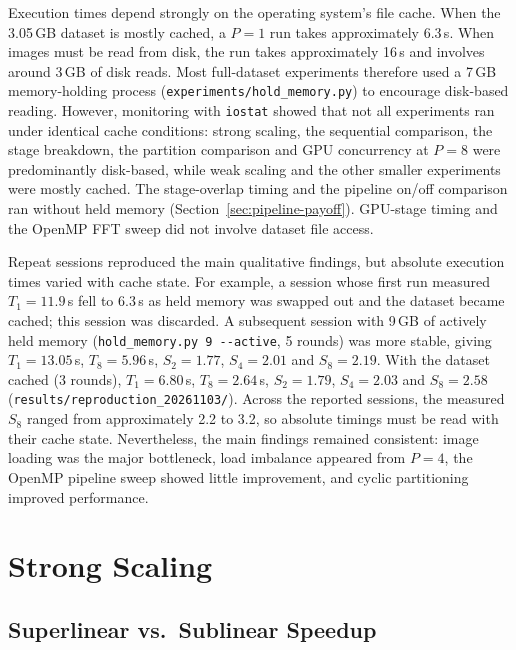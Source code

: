 \documentclass[a4paper,12pt]{report}
\begin{document}
Execution times depend strongly on the operating system's file cache. When the
3.05\,GB dataset is mostly cached, a $P=1$ run takes approximately 6.3\,s. When
images must be read from disk, the run takes approximately 16\,s and involves around
3\,GB of disk reads. Most full-dataset experiments therefore used a 7\,GB
memory-holding process (\texttt{experiments\slash{}hold\_\discretionary{}{}{}memory.py}) to
encourage disk-based reading. However, monitoring with \texttt{iostat} showed that
not all experiments ran under identical cache conditions: strong scaling, the
sequential comparison, the stage breakdown, the partition comparison and GPU
concurrency at $P=8$ were predominantly disk-based, while weak scaling and the other
smaller experiments were mostly cached. The stage-overlap timing and the pipeline
on/off comparison ran without held memory (Section~\ref{sec:pipeline-payoff}). GPU-stage timing and the OpenMP FFT sweep did not
involve dataset file access.

Repeat sessions reproduced the main qualitative findings, but absolute execution
times varied with cache state. For example, a session whose first run measured
$T_1 = 11.9$\,s fell to 6.3\,s as held memory was swapped out and the dataset
became cached; this session was discarded. A subsequent session with 9\,GB of
actively held memory (\texttt{hold\_memory.py 9 -{}-active}, 5 rounds) was more
stable, giving $T_1 = 13.05$\,s, $T_8 = 5.96$\,s, $S_2 = 1.77$, $S_4 = 2.01$ and
$S_8 = 2.19$. With the dataset cached (3 rounds), $T_1 = 6.80$\,s, $T_8 = 2.64$\,s,
$S_2 = 1.79$, $S_4 = 2.03$ and $S_8 = 2.58$
(\texttt{results\slash{}reproduction\_\discretionary{}{}{}20261103/}).
Across the reported sessions, the measured $S_8$ ranged from approximately 2.2 to
3.2, so absolute timings must be read with their cache state. Nevertheless, the main findings remained consistent: image loading
was the major bottleneck, load imbalance appeared from $P=4$, the OpenMP pipeline
sweep showed little improvement, and cyclic partitioning improved performance.

\section{Strong Scaling}
\label{sec:strong-scaling}

\subsection{Superlinear vs.\ Sublinear Speedup}
\label{sec:superlinear-sublinear}
\end{document}
